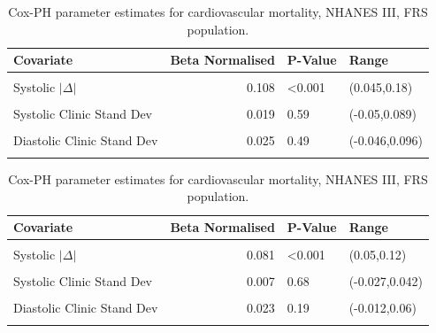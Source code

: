 \documentclass[
]{article}
\begin{document}
\begin{table}[!h]
\centering
\caption{\label{tab:freqCVDF}Cox-PH parameter estimates for cardiovascular mortality, NHANES III, FRS population.}
\centering
\begin{tabular}[t]{lrll}
\toprule
Covariate & Beta Normalised & P-Value & Range\\
\midrule
\cellcolor{gray!10}{FRS (1998)} & \cellcolor{gray!10}{0.512} & \cellcolor{gray!10}{<0.001} & \cellcolor{gray!10}{(0.34,0.67)}\\
Systolic $|\Delta|$ & 0.108 & <0.001 & (0.045,0.18)\\
\cellcolor{gray!10}{Diastolic $|\Delta|$} & \cellcolor{gray!10}{0.102} & \cellcolor{gray!10}{0.0057} & \cellcolor{gray!10}{(0.029,0.18)}\\
Systolic Clinic Stand Dev & 0.019 & 0.59 & (-0.05,0.089)\\
\cellcolor{gray!10}{Systolic Home Stand Dev} & \cellcolor{gray!10}{0.060} & \cellcolor{gray!10}{0.085} & \cellcolor{gray!10}{(-0.0082,0.13)}\\
Diastolic Clinic Stand Dev & 0.025 & 0.49 & (-0.046,0.096)\\
\cellcolor{gray!10}{Diastolic Home Stand Dev} & \cellcolor{gray!10}{0.028} & \cellcolor{gray!10}{0.46} & \cellcolor{gray!10}{(-0.045,0.1)}\\
\bottomrule
\end{tabular}
\end{table}

\begin{table}[!h]
\centering
\caption{\label{tab:freqALLF}Cox-PH parameter estimates for cardiovascular mortality, NHANES III, FRS population.}
\centering
\begin{tabular}[t]{lrll}
\toprule
Covariate & Beta Normalised & P-Value & Range\\
\midrule
\cellcolor{gray!10}{FRS (1998)} & \cellcolor{gray!10}{0.223} & \cellcolor{gray!10}{<0.001} & \cellcolor{gray!10}{(0.14,0.3)}\\
Systolic $|\Delta|$ & 0.081 & <0.001 & (0.05,0.12)\\
\cellcolor{gray!10}{Diastolic $|\Delta|$} & \cellcolor{gray!10}{0.067} & \cellcolor{gray!10}{<0.001} & \cellcolor{gray!10}{(0.032,0.11)}\\
Systolic Clinic Stand Dev & 0.007 & 0.68 & (-0.027,0.042)\\
\cellcolor{gray!10}{Systolic Home Stand Dev} & \cellcolor{gray!10}{0.017} & \cellcolor{gray!10}{0.35} & \cellcolor{gray!10}{(-0.019,0.054)}\\
Diastolic Clinic Stand Dev & 0.023 & 0.19 & (-0.012,0.06)\\
\cellcolor{gray!10}{Diastolic Home Stand Dev} & \cellcolor{gray!10}{0.012} & \cellcolor{gray!10}{0.54} & \cellcolor{gray!10}{(-0.027,0.05)}\\
\bottomrule
\end{tabular}
\end{table}
\end{document}
